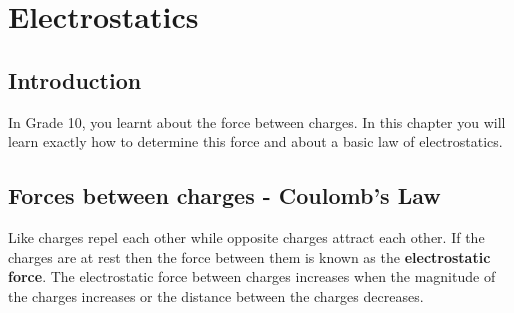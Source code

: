 \chapter{Electrostatics}
\label{p:em:es11}

\section{Introduction}
In Grade 10, you learnt about the force between charges. In this
chapter you will learn exactly how to determine this force and
about a basic law of electrostatics.\\


\section{Forces between charges - Coulomb's Law}

Like charges repel each other while opposite charges attract each other. If the charges are at rest then the force between
them is known as the \textbf{electrostatic force}. The
electrostatic force between charges increases when the magnitude
of the charges increases or the distance between the charges
decreases.\\

